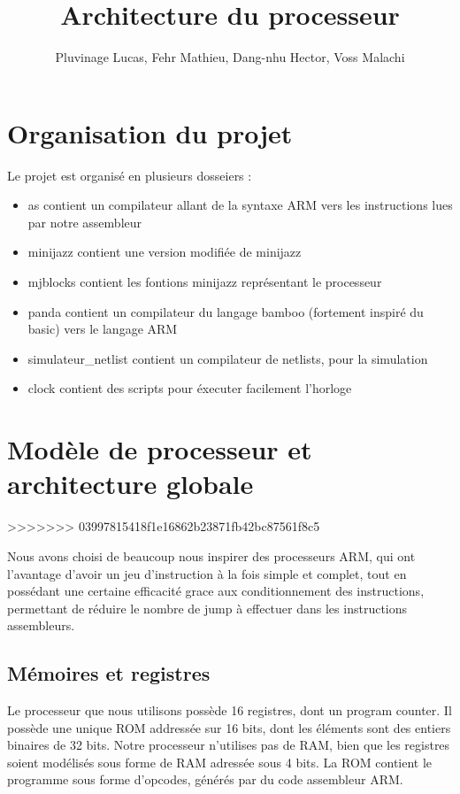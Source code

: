\documentclass[a4paper]{article}
\title{Architecture du processeur}
\author{Pluvinage Lucas, Fehr Mathieu, Dang-nhu Hector, Voss Malachi}
\begin{document}
\maketitle

\section{Organisation du projet}

Le projet est organisé en plusieurs dosseiers :
\begin{itemize}
  \item as contient un compilateur allant de la syntaxe ARM vers les
    instructions lues par notre assembleur
  \item minijazz contient une version modifiée de minijazz
  \item mjblocks contient les fontions minijazz représentant le processeur
  \item panda contient un compilateur du langage bamboo (fortement inspiré du
    basic) vers le langage ARM
  \item simulateur_netlist contient un compilateur de netlists, pour la
    simulation
  \item clock contient des scripts pour éxecuter facilement l'horloge 
\end{itemize}

\section{Modèle de processeur et architecture globale}
>>>>>>> 03997815418f1e16862b23871fb42bc87561f8c5

Nous avons choisi de beaucoup nous inspirer des processeurs ARM, qui ont
l'avantage d'avoir un jeu d'instruction à la fois simple et complet, tout en
possédant une certaine efficacité grace aux conditionnement des instructions,
permettant de réduire le nombre de jump à effectuer dans les instructions
assembleurs.

\subsection{Mémoires et registres}

Le processeur que nous utilisons possède 16 registres, dont un program counter.
Il possède une unique ROM addressée sur 16 bits, dont les éléments sont des
entiers binaires de 32 bits. Notre processeur n'utilises pas de RAM, bien que
les registres soient modélisés sous forme de RAM adressée sous 4 bits.
La ROM contient le programme sous forme d'opcodes, générés par du code
assembleur ARM.
\end{document}
